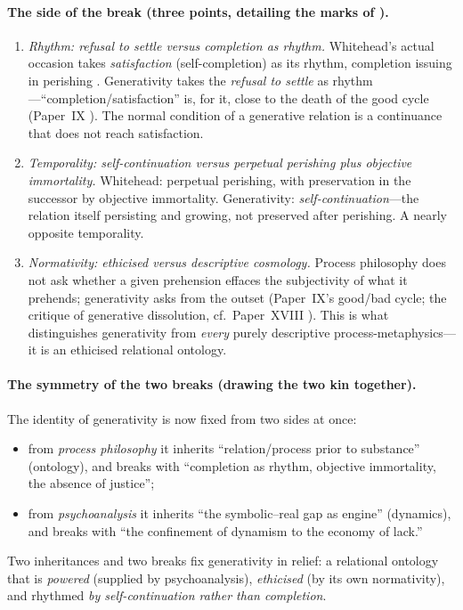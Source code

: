 \paragraph{The side of the break (three points, detailing the marks of ).}
\begin{enumerate}
  \item \emph{Rhythm: refusal to settle versus completion as rhythm.} Whitehead's actual occasion takes \emph{satisfaction} (self-completion) as its rhythm, completion issuing in perishing \parencite{whitehead1978}. Generativity takes the \emph{refusal to settle} as rhythm---``completion/satisfaction'' is, for it, close to the death of the good cycle (Paper~IX \parencite{paperix}). The normal condition of a generative relation is a continuance that does not reach satisfaction.
  \item \emph{Temporality: self-continuation versus perpetual perishing plus objective immortality.} Whitehead: perpetual perishing, with preservation in the successor by objective immortality. Generativity: \emph{self-continuation}---the relation itself persisting and growing, not preserved after perishing. A nearly opposite temporality.
  \item \emph{Normativity: ethicised versus descriptive cosmology.} Process philosophy does not ask whether a given prehension effaces the subjectivity of what it prehends; generativity asks from the outset (Paper~IX's good/bad cycle; the critique of generative dissolution, cf.\ Paper~XVIII \parencite{paperxvii}). This is what distinguishes generativity from \emph{every} purely descriptive process-metaphysics---it is an ethicised relational ontology.
\end{enumerate}

\paragraph{The symmetry of the two breaks (drawing the two kin together).} The identity of generativity is now fixed from two sides at once:
\begin{itemize}
  \item from \emph{process philosophy} it inherits ``relation/process prior to substance'' (ontology), and breaks with ``completion as rhythm, objective immortality, the absence of justice'';
  \item from \emph{psychoanalysis} it inherits ``the symbolic--real gap as engine'' (dynamics), and breaks with ``the confinement of dynamism to the economy of lack.''
\end{itemize}
Two inheritances and two breaks fix generativity in relief: a relational ontology that is \emph{powered} (supplied by psychoanalysis), \emph{ethicised} (by its own normativity), and rhythmed \emph{by self-continuation rather than completion}.

